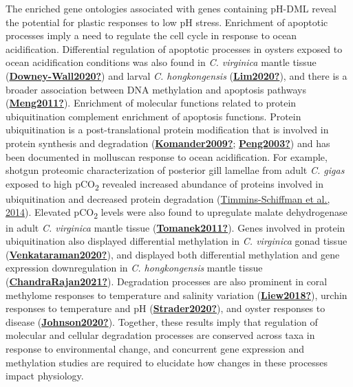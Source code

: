 \documentclass [11pt, proquest] {uwthesis}[2015/03/03]
\begin{document}
The enriched gene ontologies associated with genes containing pH-DML reveal the potential for plastic responses to low pH stress. Enrichment of apoptotic processes imply a need to regulate the cell cycle in response to ocean acidification. Differential regulation of apoptotic processes in oysters exposed to ocean acidification conditions was also found in \emph{C. virginica} mantle tissue (\protect\hyperlink{ref-Downey-Wall2020}{\textbf{Downey-Wall2020?}}) and larval \emph{C. hongkongensis} (\protect\hyperlink{ref-Lim2020}{\textbf{Lim2020?}}), and there is a broader association between DNA methylation and apoptosis pathways (\protect\hyperlink{ref-Meng2011}{\textbf{Meng2011?}}). Enrichment of molecular functions related to protein ubiquitination complement enrichment of apoptosis functions. Protein ubiquitination is a post-translational protein modification that is involved in protein synthesis and degradation (\protect\hyperlink{ref-Komander2009}{\textbf{Komander2009?}}; \protect\hyperlink{ref-Peng2003}{\textbf{Peng2003?}}) and has been documented in molluscan response to ocean acidification. For example, shotgun proteomic characterization of posterior gill lamellae from adult \emph{C. gigas} exposed to high pCO\textsubscript{2} revealed increased abundance of proteins involved in ubiquitination and decreased protein degradation (\protect\hyperlink{ref-Timmins-Schiffman2014}{Timmins-Schiffman et al., 2014}). Elevated pCO\textsubscript{2} levels were also found to upregulate malate dehydrogenase in adult \emph{C. virginica} mantle tissue (\protect\hyperlink{ref-Tomanek2011}{\textbf{Tomanek2011?}}). Genes involved in protein ubiquitination also displayed differential methylation in \emph{C. virginica} gonad tissue (\protect\hyperlink{ref-Venkataraman2020}{\textbf{Venkataraman2020?}}), and displayed both differential methylation and gene expression downregulation in \emph{C. hongkongensis} mantle tissue (\protect\hyperlink{ref-ChandraRajan2021}{\textbf{ChandraRajan2021?}}). Degradation processes are also prominent in coral methylome responses to temperature and salinity variation (\protect\hyperlink{ref-Liew2018}{\textbf{Liew2018?}}), urchin responses to temperature and pH (\protect\hyperlink{ref-Strader2020}{\textbf{Strader2020?}}), and oyster responses to disease (\protect\hyperlink{ref-Johnson2020}{\textbf{Johnson2020?}}). Together, these results imply that regulation of molecular and cellular degradation processes are conserved across taxa in response to environmental change, and concurrent gene expression and methylation studies are required to elucidate how changes in these processes impact physiology.
\end{document}
